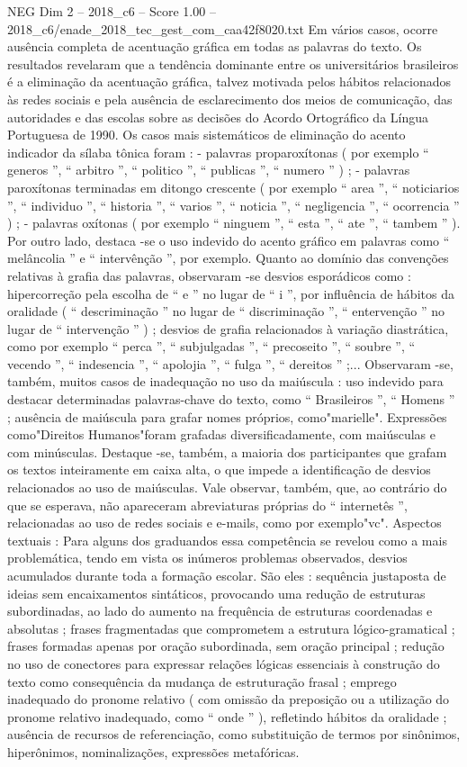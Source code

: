 \begin{textsample}{NEG Dim 2 – 2018\_c6 – Score 1.00 – 2018\_c6/enade\_2018\_tec\_gest\_com\_caa42f8020.txt}
Em vários casos, ocorre ausência completa de acentuação gráfica em todas as palavras do texto.
Os resultados revelaram que a tendência dominante entre os universitários brasileiros é a eliminação da acentuação gráfica, talvez motivada pelos hábitos relacionados às redes sociais e pela ausência de esclarecimento dos meios de comunicação, das autoridades e das escolas sobre as decisões do Acordo Ortográfico da Língua Portuguesa de 1990.
Os casos mais sistemáticos de eliminação do acento indicador da sílaba tônica foram : - palavras proparoxítonas ( por exemplo “ generos ”, “ arbitro ”, “ politico ”, “ publicas ”, “ numero ” ) ; - palavras paroxítonas terminadas em ditongo crescente ( por exemplo “ area ”, “ noticiarios ”, “ individuo ”, “ historia ”, “ varios ”, “ noticia ”, “ negligencia ”, “ ocorrencia ” ) ; - palavras oxítonas ( por exemplo “ ninguem ”, “ esta ”, “ ate ”, “ tambem ” ).
Por outro lado, destaca -se o uso indevido do acento gráfico em palavras como “ melâncolia ” e “ intervênção ”, por exemplo.
Quanto ao domínio das convenções relativas à grafia das palavras, observaram -se desvios esporádicos como : hipercorreção pela escolha de “ e ” no lugar de “ i ”, por influência de hábitos da oralidade ( “ descriminação ” no lugar de “ discriminação ”, “ entervenção ” no lugar de “ intervenção ” ) ; desvios de grafia relacionados à variação diastrática, como por exemplo “ perca ”, “ subjulgadas ”, “ precoseito ”, “ soubre ”, “ vecendo ”, “ indesencia ”, “ apolojia ”, “ fulga ”, “ dereitos ” ;...
Observaram -se, também, muitos casos de inadequação no uso da maiúscula : uso indevido para destacar determinadas palavras-chave do texto, como “ Brasileiros ”, “ Homens ” ; ausência de maiúscula para grafar nomes próprios, como"marielle".
Expressões como"Direitos Humanos"foram grafadas diversificadamente, com maiúsculas e com minúsculas.
Destaque -se, também, a maioria dos participantes que grafam os textos inteiramente em caixa alta, o que impede a identificação de desvios relacionados ao uso de maiúsculas.
Vale observar, também, que, ao contrário do que se esperava, não apareceram abreviaturas próprias do “ internetês ”, relacionadas ao uso de redes sociais e e-mails, como por exemplo"vc".
Aspectos textuais : Para alguns dos graduandos essa competência se revelou como a mais problemática, tendo em vista os inúmeros problemas observados, desvios acumulados durante toda a formação escolar.
São eles : sequência justaposta de ideias sem encaixamentos sintáticos, provocando uma redução de estruturas subordinadas, ao lado do aumento na frequência de estruturas coordenadas e absolutas ; frases fragmentadas que comprometem a estrutura lógico-gramatical ; frases formadas apenas por oração subordinada, sem oração principal ; redução no uso de conectores para expressar relações lógicas essenciais à construção do texto como consequência da mudança de estruturação frasal ; emprego inadequado do pronome relativo ( com omissão da preposição ou a utilização do pronome relativo inadequado, como “ onde ” ), refletindo hábitos da oralidade ; ausência de recursos de referenciação, como substituição de termos por sinônimos, hiperônimos, nominalizações, expressões metafóricas.

\end{textsample}
